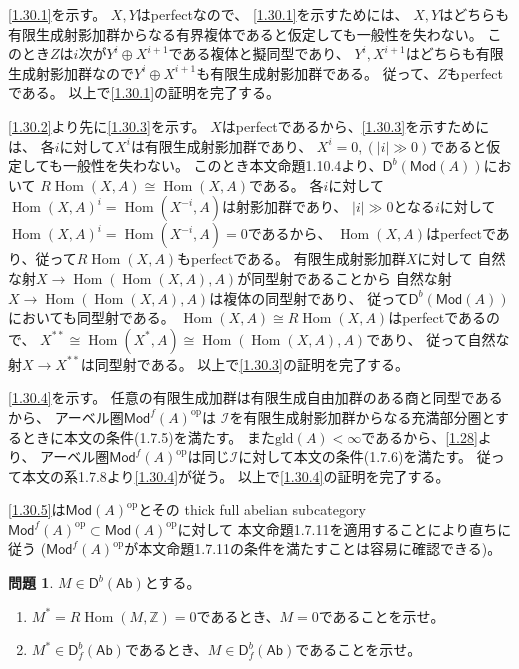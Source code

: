 \documentclass[uplatex,dvipdfmx]{jsarticle}
\makeatletter
\theoremstyle{definition}
\newtheorem{prob}[prob]{問題}
\renewenvironment{proof}[1][\proofname]{
  \pushQED{\qed}%
  \normalfont \topsep6\p@\@plus6\p@\relax
  \trivlist
  \item[\hskip\labelsep
    #1\@addpunct{\textbf{.}}]\ignorespaces
}{%
  \popQED\endtrivlist\@endpefalse
}
\providecommand{\proofname}{証明}
\DeclareMathOperator{\Hom}{\mathrm{Hom}}
\newcommand{\op}{\mathrm{op}}
\newcommand{\Ab}{\mathsf{Ab}}
\newcommand{\Mod}{\mathsf{Mod}}
\newcommand{\sfD}{\mathsf{D}}
\newcommand\Z{\mathbb{Z}}
\newcommand\mcI{\mathcal{I}}
\newcommand{\gld}{\mathrm{gld}}
\makeatother
\begin{document}
\begin{proof}
  \ref{1.30.1}を示す。
  \(X,Y\)はperfectなので、
  \ref{1.30.1}を示すためには、
  \(X,Y\)はどちらも有限生成射影加群からなる有界複体であると仮定しても一般性を失わない。
  このとき\(Z\)は\(i\)次が\(Y^i\oplus X^{i+1}\)である複体と擬同型であり、
  \(Y^i,X^{i+1}\)はどちらも有限生成射影加群なので\(Y^i\oplus X^{i+1}\)も有限生成射影加群である。
  従って、\(Z\)もperfectである。
  以上で\ref{1.30.1}の証明を完了する。

  \ref{1.30.2}より先に\ref{1.30.3}を示す。
  \(X\)はperfectであるから、\ref{1.30.3}を示すためには、
  各\(i\)に対して\(X^i\)は有限生成射影加群であり、
  \(X^i=0, (|i| \gg 0)\)であると仮定しても一般性を失わない。
  このとき本文命題1.10.4より、\(\sfD^b(\Mod(A))\)において
  \(R\Hom(X,A) \cong \Hom(X,A)\)である。
  各\(i\)に対して\(\Hom(X,A)^i = \Hom(X^{-i},A)\)は射影加群であり、
  \(|i|\gg 0\)となる\(i\)に対して\(\Hom(X,A)^i = \Hom(X^{-i},A) = 0\)であるから、
  \(\Hom(X,A)\)はperfectであり、従って\(R\Hom(X,A)\)もperfectである。
  有限生成射影加群\(X\)に対して
  自然な射\(X\to \Hom(\Hom(X,A),A)\)が同型射であることから
  自然な射\(X\to \Hom(\Hom(X,A),A)\)は複体の同型射であり、
  従って\(\sfD^b(\Mod(A))\)においても同型射である。
  \(\Hom(X,A)\cong R\Hom(X,A)\)はperfectであるので、
  \(X^{**}\cong \Hom(X^*,A)\cong \Hom(\Hom(X,A),A)\)であり、
  従って自然な射\(X\to X^{**}\)は同型射である。
  以上で\ref{1.30.3}の証明を完了する。

  \ref{1.30.4}を示す。
  任意の有限生成加群は有限生成自由加群のある商と同型であるから、
  アーベル圏\(\Mod^f(A)^{\op}\)は
  \(\mcI\)を有限生成射影加群からなる充満部分圏とするときに本文の条件(1.7.5)を満たす。
  また\(\gld(A) < \infty\)であるから、\autoref{1.28}より、
  アーベル圏\(\Mod^f(A)^{\op}\)は同じ\(\mcI\)に対して本文の条件(1.7.6)を満たす。
  従って本文の系1.7.8より\ref{1.30.4}が従う。
  以上で\ref{1.30.4}の証明を完了する。

  \ref{1.30.5}は\(\Mod(A)^{\op}\)とその
  thick full abelian subcategory
  \(\Mod^f(A)^{\op}\subset \Mod(A)^{\op}\)に対して
  本文命題1.7.11を適用することにより直ちに従う
  (\(\Mod^f(A)^{\op}\)が本文命題1.7.11の条件を満たすことは容易に確認できる)。
\end{proof}




\begin{prob}\label{1.31}
  \(M\in \sfD^b(\Ab)\)とする。
  \begin{enumerate}
    \item \label{1.31.1}
    \(M^* = R\Hom(M,\Z) = 0\)であるとき、\(M=0\)であることを示せ。
    \item \label{1.31.2}
    \(M^*\in \sfD^b_f(\Ab)\)であるとき、\(M\in \sfD^b_f(\Ab)\)であることを示せ。
  \end{enumerate}
\end{prob}
\end{document}
